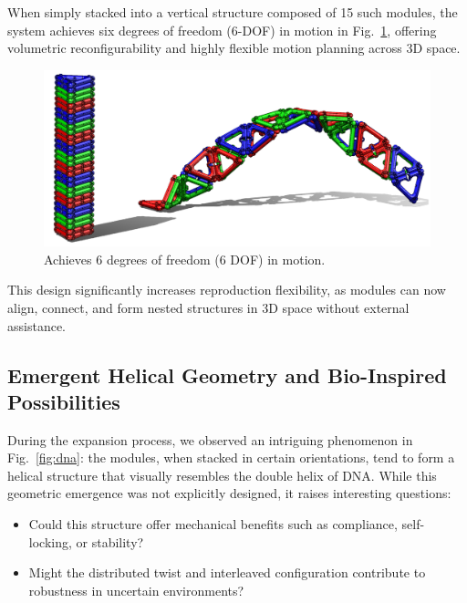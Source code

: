 \documentclass[lettersize,journal]{IEEEtran}
\begin{document}
When simply stacked into a vertical structure composed of 15 such modules, the system achieves six degrees of freedom (6-DOF) in motion in Fig.~\ref{fig:6dof}, offering volumetric reconfigurability and highly flexible motion planning across 3D space.

\begin{figure}[H]
    \centering
    \includegraphics[width=1\linewidth]{6dof.png}
    \caption{Achieves 6 degrees of freedom (6 DOF) in motion.}
    \label{fig:6dof}
\end{figure}

This design significantly increases reproduction flexibility, as modules can now align, connect, and form nested structures in 3D space without external assistance.

\subsection{Emergent Helical Geometry and Bio-Inspired Possibilities}
During the expansion process, we observed an intriguing phenomenon in Fig.~\ref{fig:dna}: the modules, when stacked in certain orientations, tend to form a helical structure that visually resembles the double helix of DNA. While this geometric emergence was not explicitly designed, it raises interesting questions:

\begin{itemize}
    \item Could this structure offer mechanical benefits such as compliance, self-locking, or stability?
    \item Might the distributed twist and interleaved configuration contribute to robustness in uncertain environments?
\end{itemize}
\end{document}
